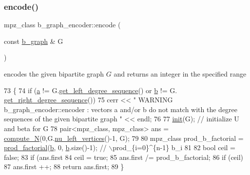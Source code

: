 \mbox{\label{classb__graph__encoder_a9dbf40f42a2eb12822b14ca10d580763}} 
\subsubsection{\texorpdfstring{encode()}{encode()}}
{\footnotesize\ttfamily mpz\+\_\+class b\+\_\+graph\+\_\+encoder\+::encode (\begin{DoxyParamCaption}\item[{const \hyperlink{classb__graph}{b\+\_\+graph} \&}]{G }\end{DoxyParamCaption})}



encodes the given bipartite graph $G$ and returns an integer in the specified range 


\begin{DoxyCode}
73 \{
74   \textcolor{keywordflow}{if} (\hyperlink{classb__graph__encoder_afd22d167f495cd85b41397f337c377c2}{a} != G.\hyperlink{classb__graph_afd65fb655f7e24217393a10533b87d3c}{get\_left\_degree\_sequence}() or \hyperlink{classb__graph__encoder_a767826e268702e45ab71565e096a52b8}{b} != G.
      \hyperlink{classb__graph_a2711566385b92b02f4c03abdc1f9a582}{get\_right\_degree\_sequence}())
75     cerr << \textcolor{stringliteral}{" WARNING b\_graph\_encoder::encoder : vectors a and/or b do not match with the degree sequences
       of the given bipartite graph  "} << endl;
76 
77   \hyperlink{classb__graph__encoder_a9b62ac0580191ac42b98d764046af7cb}{init}(G); \textcolor{comment}{// initialize U and beta for G}
78   pair<mpz\_class, mpz\_class> ans = \hyperlink{classb__graph__encoder_a3ffcfb945e8563d01e683fc5e5127d6d}{compute\_N}(0,G.\hyperlink{classb__graph_a5e71d5c97f2501b0b93c17146cf7e68e}{nu\_left\_vertices}()-1, G);
79 
80   mpz\_class prod\_b\_factorial = \hyperlink{compression__helper_8cpp_a86d8a20e022dc06b23df3b08ac10b7d1}{prod\_factorial}(\hyperlink{classb__graph__encoder_a767826e268702e45ab71565e096a52b8}{b}, 0, \hyperlink{classb__graph__encoder_a767826e268702e45ab71565e096a52b8}{b}.size()-1); \textcolor{comment}{// \(\backslash\)prod\_\{i=0\}^\{n-1\} b\_i}
81 
82   \textcolor{keywordtype}{bool} ceil = \textcolor{keyword}{false};
83   \textcolor{keywordflow}{if} (ans.first %
84     ceil = \textcolor{keyword}{true};
85   ans.first /= prod\_b\_factorial;
86   \textcolor{keywordflow}{if} (ceil)
87     ans.first ++;
88   \textcolor{keywordflow}{return} ans.first;
89 \}
\end{DoxyCode}
\mbox{\label{classb__graph__encoder_a9b62ac0580191ac42b98d764046af7cb}} 
